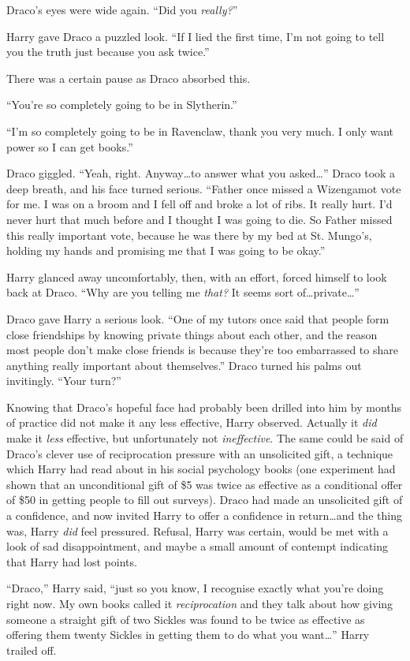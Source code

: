 Draco’s eyes were wide again. “Did you \emph{really?}”

Harry gave Draco a puzzled look. “If I lied the first time, I’m not going to tell you the truth just because you ask twice.”

There was a certain pause as Draco absorbed this.

“You’re so completely going to be in Slytherin.”

“I’m so completely going to be in Ravenclaw, thank you very much. I only want power so I can get books.”

Draco giggled. “Yeah, right. Anyway…to answer what you asked…” Draco took a deep breath, and his face turned serious. “Father once missed a Wizengamot vote for me. I was on a broom and I fell off and broke a lot of ribs. It really hurt. I’d never hurt that much before and I thought I was going to die. So Father missed this really important vote, because he was there by my bed at St. Mungo’s, holding my hands and promising me that I was going to be okay.”

Harry glanced away uncomfortably, then, with an effort, forced himself to look back at Draco. “Why are you telling me \emph{that?} It seems sort of…private…”

Draco gave Harry a serious look. “One of my tutors once said that people form close friendships by knowing private things about each other, and the reason most people don’t make close friends is because they’re too embarrassed to share anything really important about themselves.” Draco turned his palms out invitingly. “Your turn?”

Knowing that Draco’s hopeful face had probably been drilled into him by months of practice did not make it any less effective, Harry observed. Actually it \emph{did} make it \emph{less} effective, but unfortunately not \emph{ineffective}. The same could be said of Draco’s clever use of reciprocation pressure with an unsolicited gift, a technique which Harry had read about in his social psychology books (one experiment had shown that an unconditional gift of \$5 was twice as effective as a conditional offer of \$50 in getting people to fill out surveys). Draco had made an unsolicited gift of a confidence, and now invited Harry to offer a confidence in return…and the thing was, Harry \emph{did} feel pressured. Refusal, Harry was certain, would be met with a look of sad disappointment, and maybe a small amount of contempt indicating that Harry had lost points.

“Draco,” Harry said, “just so you know, I recognise exactly what you’re doing right now. My own books called it \emph{reciprocation} and they talk about how giving someone a straight gift of two Sickles was found to be twice as effective as offering them twenty Sickles in getting them to do what you want…” Harry trailed off.

